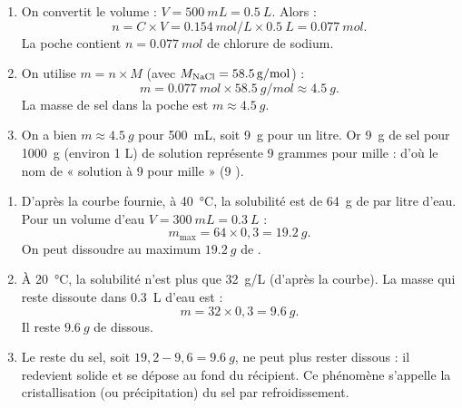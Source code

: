 \documentclass[11pt]{article}
\newcommand{\cle}[1]{{\popxbold\color{popdark}#1}}
\begin{document}
\begin{corrige}
\begin{enumerate}
\item On convertit le volume : $V = \SI{500}{mL} = \SI{0,5}{L}$. Alors :
\[ n = C \times V = \SI{0,154}{mol/L} \times \SI{0,5}{L} = \SI{0,077}{mol}. \]
La poche contient $\boxed{n = \SI{0,077}{mol}}$ de chlorure de sodium.
\item On utilise $m = n \times M$ (avec $M_{\ce{NaCl}} = \SI{58,5}{g/mol}$) :
\[ m = \SI{0,077}{mol} \times \SI{58,5}{g/mol} \approx \SI{4,5}{g}. \]
La masse de sel dans la poche est $\boxed{m \approx \SI{4,5}{g}}$.
\item On a bien $m \approx \SI{4,5}{g}$ pour \SI{500}{mL}, soit \SI{9}{g} pour un litre. Or \SI{9}{g} de sel pour \SI{1000}{g} (environ 1 L) de solution représente 9 grammes pour mille : d'où le nom de « solution à 9 pour mille » (9 \textperthousand).
\end{enumerate}
\end{corrige}

\begin{corrige}
\begin{enumerate}
\item D'après la courbe fournie, à \SI{40}{\celsius}, la solubilité est de \SI{64}{g} de  par litre d'eau. Pour un volume d'eau $V = \SI{300}{mL} = \SI{0,3}{L}$ :
\[ m_{\max} = 64 \times 0,3 = \SI{19,2}{g}. \]
On peut dissoudre au maximum $\boxed{\SI{19,2}{g}}$ de .
\item À \SI{20}{\celsius}, la solubilité n'est plus que \SI{32}{g/L} (d'après la courbe). La masse qui reste dissoute dans \SI{0,3}{L} d'eau est :
\[ m = 32 \times 0,3 = \SI{9,6}{g}. \]
Il reste $\boxed{\SI{9,6}{g}}$ de  dissous.
\item Le reste du sel, soit $19,2 - 9,6 = \SI{9,6}{g}$, ne peut plus rester dissous : il redevient solide et se dépose au fond du récipient. Ce phénomène s'appelle la \cle{cristallisation} (ou précipitation) du sel par refroidissement.
\end{enumerate}
\end{corrige}
\end{document}
